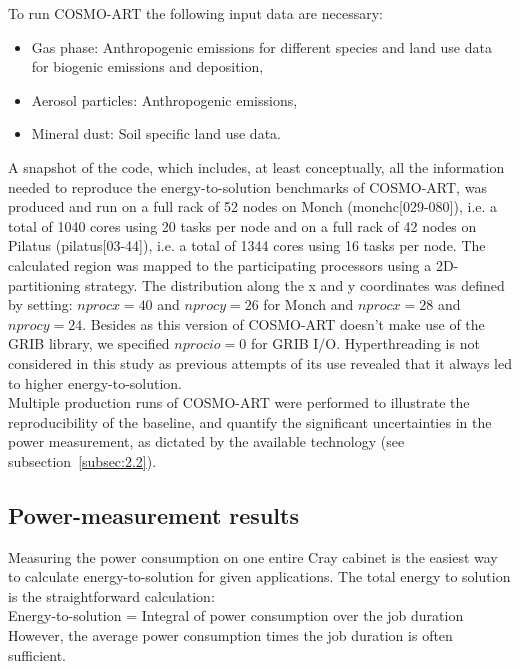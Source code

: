 \noindent
To run COSMO-ART the following input data are necessary:
\begin{itemize}
\item  Gas phase:  Anthropogenic emissions  for different  species and
  land use data for biogenic emissions and deposition,
\item Aerosol particles: Anthropogenic emissions,
\item Mineral dust: Soil specific land use data.
\end{itemize}

A snapshot of the code, which includes, at least conceptually, all the
information needed  to reproduce the  energy-to-solution benchmarks of
COSMO-ART, was  produced and run on a  full rack of 52  nodes on Monch
(monchc[029-080]), i.e.  a total of 1040 cores using 20 tasks per node
and on  a full rack of  42 nodes on Pilatus  (pilatus[03-44]), i.e.  a
total of  1344 cores using 16  tasks per node.   The calculated region
was  mapped to  the participating  processors using  a 2D-partitioning
strategy.  The distribution along the  x and y coordinates was defined
by setting: $nprocx=40$ and  $nprocy=26$ for Monch and $nprocx=28$ and
$nprocy=24$.  Besides as this version of COSMO-ART doesn't make use of
the   GRIB   library,  we   specified   $nprocio=0$   for  GRIB   I/O.
Hyperthreading is not considered in this study as previous attempts of
its use revealed that it always led to higher energy-to-solution.\\

Multiple production runs of COSMO-ART were performed to illustrate the
reproducibility  of   the  baseline,  and   quantify  the  significant
uncertainties in  the power measurement, as dictated  by the available
technology (see subsection~\ref{subsec:2.2}).

\subsection{Power-measurement results}
\label{subsec:3.3}
Measuring  the power  consumption on  one entire  Cray cabinet  is the
easiest    way    to    calculate   energy-to-solution    for    given
applications.  The total  energy  to solution  is the  straightforward
calculation:\\

Energy-to-solution  =  Integral  of  power consumption  over  the  job
duration\\

However, the average power consumption times the job duration is often
sufficient.

